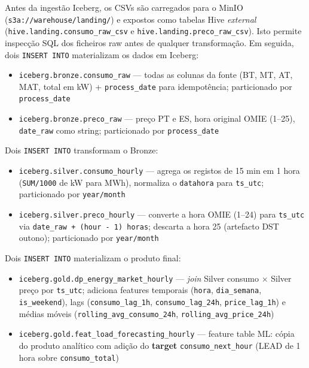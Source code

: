 \documentclass[11pt,a4paper]{article}
\begin{document}
\begin{description}[leftmargin=*]
  \item[\textbf{Bronze — Landing + Ingestão}]
    Antes da ingestão Iceberg, os CSVs são carregados para o MinIO (\texttt{s3a://warehouse/landing/}) e expostos como tabelas Hive \textit{external} (\texttt{hive.landing.consumo\_raw\_csv} e \texttt{hive.landing.preco\_raw\_csv}). Isto permite inspecção SQL dos ficheiros raw antes de qualquer transformação. Em seguida, dois \texttt{INSERT INTO} materializam os dados em Iceberg:
    \begin{itemize}[leftmargin=*,noitemsep]
      \item \texttt{iceberg.bronze.consumo\_raw} — todas as colunas da fonte (BT, MT, AT, MAT, total em kW) + \texttt{process\_date} para idempotência; particionado por \texttt{process\_date}
      \item \texttt{iceberg.bronze.preco\_raw} — preço PT e ES, hora original OMIE (1--25), \texttt{date\_raw} como string; particionado por \texttt{process\_date}
    \end{itemize}

  \item[\textbf{Silver — Normalização e Validação}]
    Dois \texttt{INSERT INTO} transformam o Bronze:
    \begin{itemize}[leftmargin=*,noitemsep]
      \item \texttt{iceberg.silver.consumo\_hourly} — agrega os registos de 15 min em 1 hora (\texttt{SUM/1000} de kW para MWh), normaliza o \texttt{datahora} para \texttt{ts\_utc}; particionado por \texttt{year/month}
      \item \texttt{iceberg.silver.preco\_hourly} — converte a hora OMIE (1--24) para \texttt{ts\_utc} via \texttt{date\_raw + (hour - 1) horas}; descarta a hora 25 (artefacto DST outono); particionado por \texttt{year/month}
    \end{itemize}

  \item[\textbf{Gold — Produto Analítico e Feature Table}]
    Dois \texttt{INSERT INTO} materializam o produto final:
    \begin{itemize}[leftmargin=*,noitemsep]
      \item \texttt{iceberg.gold.dp\_energy\_market\_hourly} — \textit{join} Silver consumo $\times$ Silver preço por \texttt{ts\_utc}; adiciona features temporais (\texttt{hora}, \texttt{dia\_semana}, \texttt{is\_weekend}), lags (\texttt{consumo\_lag\_1h}, \texttt{consumo\_lag\_24h}, \texttt{price\_lag\_1h}) e médias móveis (\texttt{rolling\_avg\_consumo\_24h}, \texttt{rolling\_avg\_price\_24h})
      \item \texttt{iceberg.gold.feat\_load\_forecasting\_hourly} — feature table ML: cópia do produto analítico com adição do \textbf{target} \texttt{consumo\_next\_hour} (LEAD de 1 hora sobre \texttt{consumo\_total})
    \end{itemize}
\end{description}
\end{document}
